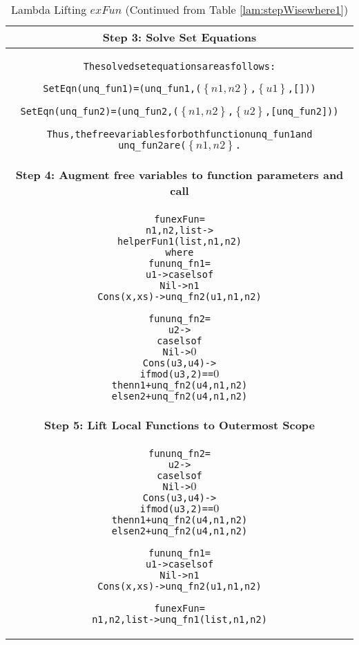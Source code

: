 \documentclass[11pt]{article}
\begin{document}
\begin{table}[h!]
\begin{center}
\begin{tabular}{|c|} \hline
{\bf Step 3: Solve Set Equations}\\ 
\hline
\begin{minipage}{4in}
\begin{alltt}


The solved set equations are as follows:

SetEqn(unq_fun1) = (unq_fun1,(\(\left\{n1,n2\right\}\),\(\left\{u1\right\}\),[]))

SetEqn(unq_fun2) = (unq_fun2,(\(\left\{n1,n2\right\}\),\(\left\{u2\right\}\),[unq_fun2]))

Thus, the free variables for both function unq_fun1 and 
unq_fun2 are (\(\left\{n1,n2\right\}\).

\end{alltt} 
\end {minipage} \\ 
\hline 
{\bf Step 4: Augment free variables to function parameters and call }\\ 
\hline
\begin{minipage}{4in}
\begin{alltt}


  fun exFun = 
    n1,n2,list -> 
        helperFun1 (list,n1,n2)
      where
        fun unq_fn1 = 
          u1 -> case ls of 
                  Nil -> n1
                  Cons(x,xs) -> unq_fn2(u1,n1,n2)

        fun unq_fn2 =
          u2 -> 
            case ls of
              Nil -> \(0\)
              Cons(u3,u4) ->
                if mod(u3,2) == \(0\) 
                  then n1 + unq_fn2(u4,n1,n2)
                  else n2 + unq_fn2(u4,n1,n2) 


\end{alltt} 
\end {minipage}\\ 
\hline 
{\bf Step 5: Lift Local Functions to Outermost Scope}\\ 
\hline 
\begin{minipage}{4in}
\begin{alltt}


  fun unq_fn2 =
    u2 -> 
      case ls of
        Nil -> \(0\)
        Cons(u3,u4) ->
          if mod(u3,2) == \(0\) 
            then n1 + unq_fn2(u4,n1,n2)
            else n2 + unq_fn2(u4,n1,n2) 

  fun unq_fn1 = 
    u1 -> case ls of 
            Nil -> n1
            Cons(x,xs) -> unq_fn2(u1,n1,n2)

  fun exFun = 
    n1,n2,list -> unq_fn1(list,n1,n2)

\end{alltt} 
\end {minipage}
\tabularnewline
\hline
\end{tabular}
\caption{Lambda Lifting $exFun$ (Continued from Table \ref {lam:stepWisewhere1})}
\label{lam:stepWisewhere2}
\end{center}
\end{table}
\end{document}
